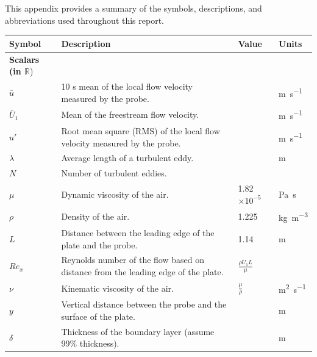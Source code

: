 \documentclass{article}
\begin{document}
This appendix provides a summary of the symbols, descriptions, and abbreviations used throughout this report.

\begin{table}[H]
    \centering
    \begin{tabularx}{\textwidth}{l X l l}
        \toprule
        \textbf{Symbol} & \textbf{Description} & \textbf{Value} & \textbf{Units} \\
        \midrule
        \textbf{Scalars (in $\mathbb{R}$})   &                                     &          &                             \\
        $\bar{u}$          & 10 \unit{\second} mean of the local flow velocity measured by the probe.                         &          & \unit{\metre \per \second} \\
        $\bar{U}_1$          & Mean of the freestream flow velocity.       &          & \unit{\metre \per \second} \\
        $u'$               & Root mean square (RMS) of the local flow velocity measured by the probe.                 &      & \unit{\metre \per \second}  \\
        $\lambda$               & Average length of a turbulent eddy.                       &     & \unit{\metre}            \\
        $N$             & Number of turbulent eddies.  &     &             \\
        $\mu$             & Dynamic viscosity of the air.  & 1.82 $\times 10^{-5}$    & \unit{\pascal \second}            \\
        $\rho$             & Density of the air.  & 1.225    & \unit{\kilogram \per \metre \cubed}          \\
        $L$             & Distance between the leading edge of the plate and the probe.  & 1.14    & \unit{\metre}          \\
        $Re_x$           & Reynolds number of the flow based on distance from the leading edge of the plate.     & $\frac{\rho \bar{U}_1 L}{\mu}$   &             \\
        $\nu$             & Kinematic viscosity of the air.  & $\frac{\mu}{\rho}$    & \unit{\metre \squared \per \second}            \\
        $y$          & Vertical distance between the probe and the surface of the plate.                         &          & \unit{\metre} \\
        $\delta$          & Thickness of the boundary layer (assume 99\% thickness).                         &          & \unit{\metre}  \\

\end{tabularx}
\end{table}
\end{document}
